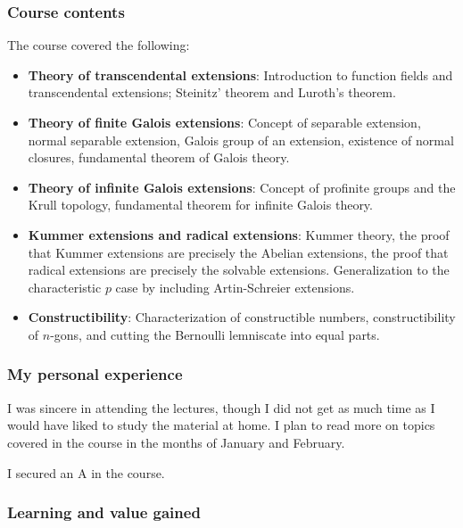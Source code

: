 \documentclass[a4paper]{amsart}
\begin{document}
\subsubsection{Course contents}

The course covered the following:

\begin{itemize}

\item {\bf Theory of transcendental extensions}: Introduction to function fields and transcendental extensions;
  Steinitz' theorem and Luroth's theorem.

\item {\bf Theory of finite Galois extensions}: Concept of separable extension, normal separable extension,
  Galois group of an extension, existence of normal closures, fundamental theorem of Galois theory.

\item {\bf Theory of infinite Galois extensions}: Concept of profinite groups and the Krull topology, fundamental
  theorem for infinite Galois theory.

\item {\bf Kummer extensions and radical extensions}: Kummer theory, the proof that Kummer extensions are precisely
  the Abelian extensions, the proof that radical extensions are precisely the solvable extensions.
  Generalization to the characteristic $p$ case by including Artin-Schreier extensions.

\item {\bf Constructibility}: Characterization of constructible numbers, constructibility of $n$-gons, and cutting
  the Bernoulli lemniscate into equal parts.

\end{itemize}

\subsubsection{My personal experience}

I was sincere in attending the lectures, though I did not get as much
time as I would have liked to study the material at home. I plan to
read more on topics covered in the course in the months of January and
February.

I secured an A in the course.

\subsubsection{Learning and value gained}
\end{document}
